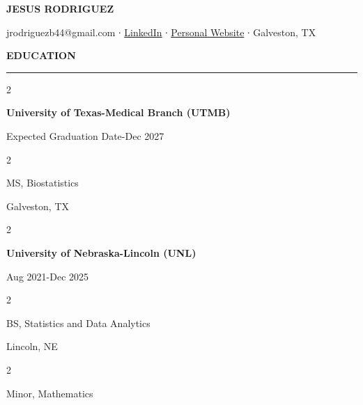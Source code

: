 \documentclass[
  16,
]{article}
\author{}
\date{}
\begin{document}
\begin{huge}\begin{center}{\bf JESUS RODRIGUEZ}\end{center}\end{huge}

\begin{center}jrodriguezb44@gmail.com ∙ 
\href{https://www.linkedin.com/in/jesus-rodriguez-09ab12178}{LinkedIn} ∙
\href{https://jesusrod44.github.io/portfolio}{Personal Website} ∙
Galveston, TX
\end{center}
\vspace{3.5pt}

\begin{large}
  {\bf EDUCATION}
  \vspace{3pt}
  \hrule
  \begin{multicols}{2}
    \begin{flushleft}{\bf University of Texas-Medical Branch (UTMB)}\end{flushleft}
    \begin{flushright}Expected Graduation Date-Dec 2027\end{flushright}
  \end{multicols}
  \vspace{-0.17cm}
  \begin{multicols}{2}
    \begin{flushleft}MS, Biostatistics\end{flushleft}
    \begin{flushright}Galveston, TX\end{flushright}
  \end{multicols}
  \vspace{-0.17cm}
\end{large}

\vspace{3pt}

\begin{large}
  \vspace{3pt}
  \begin{multicols}{2}
    \begin{flushleft}{\bf University of Nebraska-Lincoln (UNL)}\end{flushleft}
    \begin{flushright}Aug 2021-Dec 2025\end{flushright}
  \end{multicols}
  \vspace{-0.17cm}
  \begin{multicols}{2}
    \begin{flushleft}BS, Statistics and Data Analytics\end{flushleft}
    \begin{flushright}Lincoln, NE\end{flushright}
  \end{multicols}
  \vspace{-0.17cm}
  \begin{multicols}{2}
    \begin{flushleft}Minor, Mathematics\end{flushleft}
  \end{multicols}
\end{large}
\end{document}
